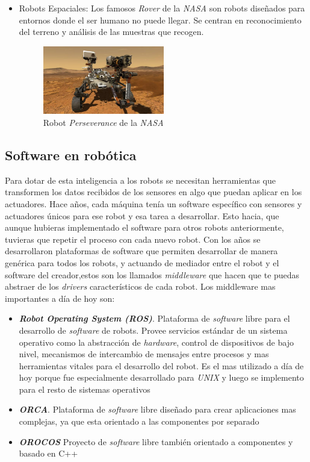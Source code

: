 \begin{itemize}
    \item Robots Espaciales: Los famosos \textit{Rover} de la \textit{NASA} son robots diseñados para entornos donde el ser humano no puede llegar. Se centran en reconocimiento del terreno y análisis de las muestras que recogen.
        \begin{figure}[H]
    \centering
    \includegraphics[width=0.5\textwidth]{img/perseverance.jpg}
    \caption{Robot \textit{Perseverance} de la \textit{NASA}} \label{fig:Perseverance}
    \end{figure}
\end{itemize}

\subsection{Software en robótica}
\label{subsec:softwarerobot}
Para dotar de esta inteligencia a los robots se necesitan herramientas que transformen los datos recibidos de los sensores en algo que puedan aplicar en los actuadores. Hace años, cada máquina tenía un software específico con sensores y actuadores únicos para ese robot y esa tarea a desarrollar. Esto hacia, que aunque hubieras implementado el software para otros robots anteriormente, tuvieras que repetir el proceso con cada nuevo robot. Con los años se desarrollaron plataformas de software que permiten desarrollar de manera genérica para todos los robots, y actuando de mediador entre el robot y el software del creador,estos son los llamados \textit{middleware} que hacen que te puedas abstraer de los \textit{drivers} característicos de cada robot. Los middleware mas importantes a día de hoy son:
\begin{itemize}
    \item \textit{\textbf{Robot Operating System (ROS)}}\cite{bib:ros}. Plataforma de \textit{software} libre para el desarrollo de \textit{software} de robots. Provee servicios estándar de un sistema operativo como la abstracción de \textit{hardware}, control de dispositivos de bajo nivel, mecanismos de intercambio de mensajes entre procesos y mas herramientas vitales para el desarrollo del robot. Es el mas utilizado a día de hoy porque fue especialmente desarrollado para \textit{UNIX} y luego se implemento para el resto de sistemas operativos
    \item \textit{\textbf{ORCA}}\cite{bib:orca}. Plataforma de \textit{software} libre diseñado para crear aplicaciones mas complejas, ya que esta orientado a las componentes por separado
     \item \textit{\textbf{OROCOS}}\cite{bib:orocos} Proyecto de \textit{software} libre también orientado a componentes y basado en C++

\end{itemize}{}

